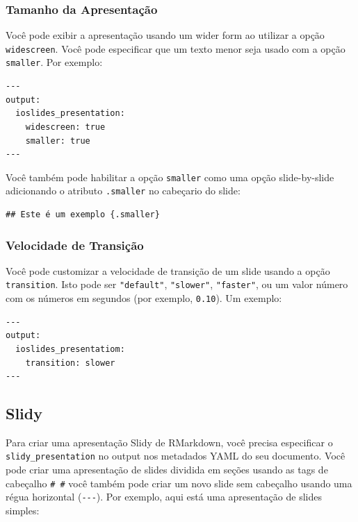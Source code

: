 \documentclass[
]{book}
\begin{document}
\hypertarget{tamanho-da-apresentauxe7uxe3o}{%
\subsubsection*{Tamanho da Apresentação}\label{tamanho-da-apresentauxe7uxe3o}}

Você pode exibir a apresentação usando um wider form ao utilizar a opção \texttt{widescreen}. Você pode especificar que um texto menor seja usado com a opção \texttt{smaller}. Por exemplo:

\begin{verbatim}
---
output:
  ioslides_presentation:
    widescreen: true
    smaller: true
---
\end{verbatim}

Você também pode habilitar a opção \texttt{smaller} como uma opção slide-by-slide adicionando o atributo \texttt{.smaller} no cabeçario do slide:

\begin{verbatim}
## Este é um exemplo {.smaller}
\end{verbatim}

\hypertarget{velocidade-de-transiuxe7uxe3o}{%
\subsubsection*{Velocidade de Transição}\label{velocidade-de-transiuxe7uxe3o}}

Você pode customizar a velocidade de transição de um slide usando a opção \texttt{transition}. Isto pode ser \texttt{"default"}, \texttt{"slower"}, \texttt{"faster"}, ou um valor número com os números em segundos (por exemplo, \texttt{0.10}). Um exemplo:

\begin{verbatim}
---
output:
  ioslides_presentatiom:
    transition: slower
---
\end{verbatim}

\hypertarget{slidy}{%
\subsection{Slidy}\label{slidy}}

Para criar uma apresentação Slidy de RMarkdown, você precisa especificar o \texttt{slidy\_presentation} no output nos metadados YAML do seu documento. Você pode criar uma apresentação de slides dividida em seções usando as tags de cabeçalho \texttt{\#\ \#} você também pode criar um novo slide sem cabeçalho usando uma régua horizontal (\texttt{-\/-\/-}). Por exemplo, aqui está uma apresentação de slides simples:
\end{document}

